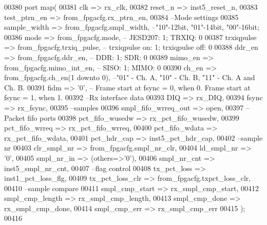 \begin{DoxyCode}
00380    \textcolor{keywordflow}{port} \textcolor{keywordflow}{map}(
00381       clk                  => rx_clk,
00382       reset_n              => inst5_reset_n,
00383       test_ptrn_en         => from\_fpgacfg.rx\_ptrn\_en,
00384 \textcolor{keyword}{      --Mode settings}
00385       sample_width         => from\_fpgacfg.smpl\_width,\textcolor{keyword}{ --"10"-12bit, "01"-14bit, "00"-16bit;}
00386       mode                 => from\_fpgacfg.mode,\textcolor{keyword}{       -- JESD207: 1; TRXIQ: 0}
00387       trxiqpulse           => from\_fpgacfg.trxiq\_pulse,\textcolor{keyword}{ -- trxiqpulse on: 1; trxiqpulse off: 0}
00388       ddr_en               => from\_fpgacfg.ddr\_en,\textcolor{keyword}{     -- DDR: 1; SDR: 0}
00389       mimo_en              => from\_fpgacfg.mimo\_int\_en,\textcolor{keyword}{    -- SISO: 1; MIMO: 0}
00390       ch_en                => from\_fpgacfg.ch\_en\textcolor{vhdlchar}{(}\textcolor{vhdllogic}{1} \textcolor{keywordflow}{downto} \textcolor{vhdllogic}{0}\textcolor{vhdlchar}{)},\textcolor{keyword}{      --"01" - Ch. A, "10" - Ch. B, "11" - Ch.
       A and Ch. B. }
00391       fidm                 => '0',\textcolor{keyword}{       -- Frame start at fsync = 0, when 0. Frame start at fsync = 1,
       when 1.}
00392 \textcolor{keyword}{      --Rx interface data }
00393       DIQ                  => rx_DIQ,
00394       fsync                => rx_fsync,
00395 \textcolor{keyword}{      --samples}
00396       smpl_fifo_wrreq_out  => \textcolor{keywordflow}{open},
00397 \textcolor{keyword}{      --Packet fifo ports }
00398       pct_fifo_wusedw      => rx_pct_fifo_wusedw,
00399       pct_fifo_wrreq       => rx_pct_fifo_wrreq,
00400       pct_fifo_wdata       => rx_pct_fifo_wdata,
00401       pct\_hdr\_cap          => inst5_pct_hdr_cap,
00402 \textcolor{keyword}{      --sample nr}
00403       clr_smpl_nr          => from\_fpgacfg.smpl\_nr\_clr,
00404       ld_smpl_nr           => '0',
00405       smpl_nr_in           => \textcolor{vhdlchar}{(}\textcolor{keywordflow}{others}=>'0'\textcolor{vhdlchar}{)},
00406       smpl_nr_cnt          => inst5_smpl_nr_cnt,
00407 \textcolor{keyword}{      --flag control}
00408       tx_pct_loss          => inst1_pct_loss_flg,
00409       tx_pct_loss_clr      => from\_fpgacfg.txpct\_loss\_clr,
00410 \textcolor{keyword}{      --sample compare}
00411       smpl_cmp_start       => rx_smpl_cmp_start,
00412       smpl_cmp_length      => rx_smpl_cmp_length,
00413       smpl_cmp_done        => rx_smpl_cmp_done,
00414       smpl_cmp_err         => rx_smpl_cmp_err
00415    \textcolor{vhdlchar}{)};
00416    

\end{DoxyCode}
